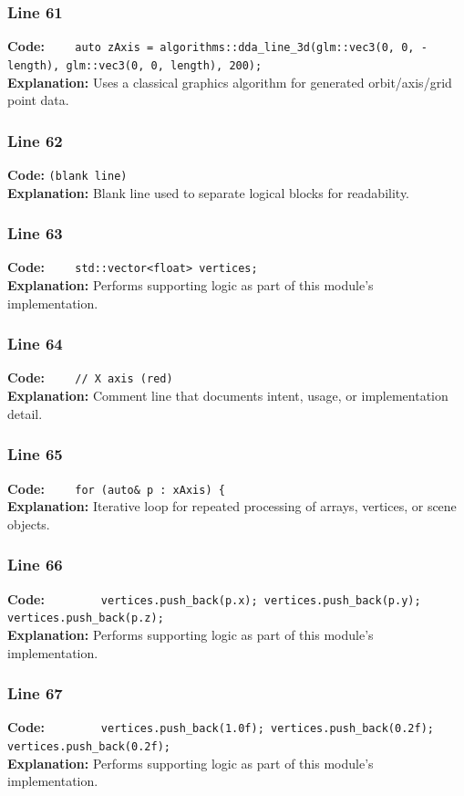 \documentclass[11pt,a4paper]{article}
\begin{document}
\subsubsection*{Line 61}
\textbf{Code:} \verb|    auto zAxis = algorithms::dda_line_3d(glm::vec3(0, 0, -length), glm::vec3(0, 0, length), 200);|\\
\textbf{Explanation:} Uses a classical graphics algorithm for generated orbit/axis/grid point data.

\subsubsection*{Line 62}
\textbf{Code:} \texttt{(blank line)}\\
\textbf{Explanation:} Blank line used to separate logical blocks for readability.

\subsubsection*{Line 63}
\textbf{Code:} \verb|    std::vector<float> vertices;|\\
\textbf{Explanation:} Performs supporting logic as part of this module's implementation.

\subsubsection*{Line 64}
\textbf{Code:} \verb|    // X axis (red)|\\
\textbf{Explanation:} Comment line that documents intent, usage, or implementation detail.

\subsubsection*{Line 65}
\textbf{Code:} \verb|    for (auto& p : xAxis) {|\\
\textbf{Explanation:} Iterative loop for repeated processing of arrays, vertices, or scene objects.

\subsubsection*{Line 66}
\textbf{Code:} \verb|        vertices.push_back(p.x); vertices.push_back(p.y); vertices.push_back(p.z);|\\
\textbf{Explanation:} Performs supporting logic as part of this module's implementation.

\subsubsection*{Line 67}
\textbf{Code:} \verb|        vertices.push_back(1.0f); vertices.push_back(0.2f); vertices.push_back(0.2f);|\\
\textbf{Explanation:} Performs supporting logic as part of this module's implementation.
\end{document}
